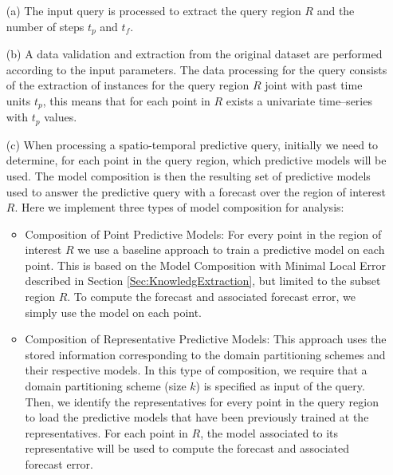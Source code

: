 \begin{itemize}
    \item [(a)] The input query is processed to extract the query region $R$ and the number of steps $t_p$ and $t_f$.
    \item [(b)] A data validation and extraction from the original dataset are performed according to the input parameters. The data processing for the query consists of the extraction of instances for the query region $R$ joint with past time units $t_{p}$, this means that for each point in $R$ exists a univariate time--series with $t_{p}$ values.
    \item [(c)] When processing a spatio-temporal predictive query, initially we need to determine, for each point in the query region, which predictive models will be used. The model composition is then the resulting set of predictive models used to answer the predictive query with a forecast over the region of interest $R$. Here we implement three types of model composition for analysis:

   \begin{itemize}
	\item Composition of Point Predictive Models: For every point in the region of interest $R$ we use a baseline approach to train a predictive model on each point. This is based on the Model Composition with Minimal Local Error described in Section \ref{Sec:KnowledgExtraction}, but limited to the subset region $R$. To compute the forecast and associated forecast error, we simply use the model on each point.

	\item Composition of Representative Predictive Models: This approach uses the stored information corresponding to the domain partitioning schemes and their respective models. In this type of composition, we require that a domain partitioning scheme (size $k$) is specified as input of the query. Then, we identify the representatives for every point in the query region to load the predictive models that have been previously trained at the representatives. For each point in $R$, the model associated to its representative will be used to compute the forecast and associated forecast error.
	

\end{itemize}
\end{itemize}

